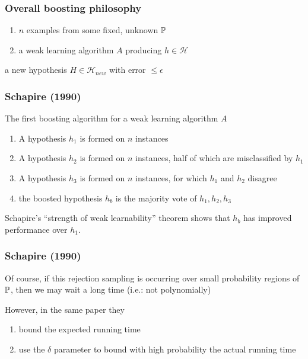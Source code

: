\documentclass[12pt]{beamer}
\begin{document}
\begin{frame}[fragile]
\frametitle{Overall boosting philosophy}
\begin{enumerate}
\item  $n$ examples from some fixed, unknown $\P$
\item a weak learning algorithm $A$ producing $h \in \mathcal{H}$
\end{enumerate}
\vsp

 a new hypothesis $H \in \mathcal{H}_{new}$ with error $\leq \epsilon$

\end{frame}

\begin{frame}[fragile]
\frametitle{Schapire (1990)}
The first boosting algorithm for a weak learning algorithm $A$
\begin{enumerate}
\item  A hypothesis $h_1$ is formed on $n$ instances
\item A hypothesis $h_2$ is formed on $n$ instances, half of which are misclassified by $h_1$

\item A hypothesis $h_3$ is formed on $n$ instances, for which $h_1$ and $h_2$ disagree
\item the boosted hypothesis $h_b$ is the majority vote of $h_1,h_2,h_3$
\end{enumerate}
\vsp

Schapire's ``strength of weak learnability'' theorem shows that $h_b$ has improved performance over $h_1$.
\end{frame}

\begin{frame}[fragile]
\frametitle{Schapire (1990)}
Of course, if this rejection sampling is occurring over small probability regions of $\P$, then we may wait a long
time (i.e.: not polynomially)

\vsp
However, in the same paper they 
\begin{enumerate}
\item bound the expected running time
\item use the $\delta$ parameter to bound with high probability the actual running time
\end{enumerate}
\end{frame}
\end{document}

